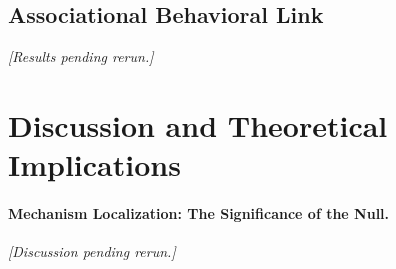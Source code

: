 \documentclass[11pt]{article}
\begin{document}

\subsection{Associational Behavioral Link}
\emph{[Results pending rerun.]}

\section{Discussion and Theoretical Implications}

\paragraph{Mechanism Localization: The Significance of the Null.}
\emph{[Discussion pending rerun.]}
\end{document}
